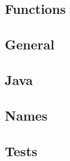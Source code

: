 \documentclass[a4paper, twocolumn]{article}
\begin{document}
\subsection{Functions}

\subsection{General}

\subsection{Java}

\subsection{Names}

\subsection{Tests}
\end{document}
